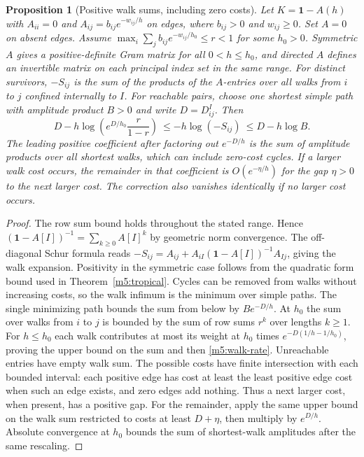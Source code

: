 \documentclass[11pt,reqno]{amsart}
\newtheorem{proposition}[theorem]{Proposition}
\theoremstyle{definition}
\theoremstyle{remark}
\numberwithin{equation}{section}
\begin{document}
\begin{proposition}[Positive walk sums, including zero costs]\label{m5:walksum}
Let \(K=\mathbf 1-A(h)\) with \(A_{ii}=0\) and \(A_{ij}=b_{ij}e^{-w_{ij}/h}\)
on edges, where \(b_{ij}>0\) and \(w_{ij}\geq0\). Set \(A=0\) on
absent edges. Assume \(\max_i\sum_j b_{ij}e^{-w_{ij}/h_0}\leq r<1\)
for some \(h_0>0\). Symmetric \(A\) gives a positive-definite Gram
matrix for all \(0<h\le h_0\), and directed \(A\) defines an invertible
matrix on each principal index set in the same range. For distinct
survivors, \(-S_{ij}\) is the sum of the products of the \(A\)-entries
over all walks from \(i\) to \(j\) confined internally to \(I\).
For reachable pairs, choose one shortest simple path with amplitude
product \(B>0\) and write \(D=D^I_{ij}\). Then
\begin{equation}\label{m5:walk-rate}
 D-h\log\!\left(e^{D/h_0}\frac{r}{1-r}\right)
 \ \leq -h\log(-S_{ij})\ \leq D-h\log B.
\end{equation}
The leading positive coefficient after factoring out \(e^{-D/h}\)
is the sum of amplitude products over all shortest walks, which can
include zero-cost cycles. If a larger walk cost occurs, the remainder
in that coefficient is \(O(e^{-\eta/h})\) for the gap \(\eta>0\) to
the next larger cost. The correction also vanishes identically if
no larger cost occurs.
\end{proposition}
\begin{proof}
The row sum bound holds throughout the stated range. Hence
\((\mathbf 1-A[I])^{-1}=\sum_{k\ge0}A[I]^k\) by geometric norm
convergence. The off-diagonal Schur formula reads
\(-S_{ij}=A_{ij}+A_{iI}(\mathbf 1-A[I])^{-1}A_{Ij}\), giving the
walk expansion. Positivity in the symmetric case follows from the
quadratic form bound used in Theorem~\ref{m5:tropical}.
Cycles can be removed from walks without increasing costs, so the
walk infimum is the minimum over simple paths. The single minimizing
path bounds the sum from below by \(Be^{-D/h}\).
At \(h_0\) the sum over walks from \(i\) to \(j\) is bounded by the
sum of row sums \(r^k\) over lengths \(k\ge1\).
For \(h\le h_0\) each walk contributes at most its weight at \(h_0\)
times \(e^{-D(1/h-1/h_0)}\), proving the upper bound on the sum and
then \eqref{m5:walk-rate}. Unreachable entries have empty walk sum.
The possible costs have finite intersection with each bounded interval:
each positive edge has cost at least the least positive edge cost when
such an edge exists, and zero edges add nothing. Thus a next larger
cost, when present, has a positive gap. For the remainder, apply the
same upper bound on the walk sum restricted to costs at least
\(D+\eta\), then multiply by \(e^{D/h}\). Absolute convergence at \(h_0\)
bounds the sum of shortest-walk amplitudes after the same rescaling.
\end{proof}
\end{document}
